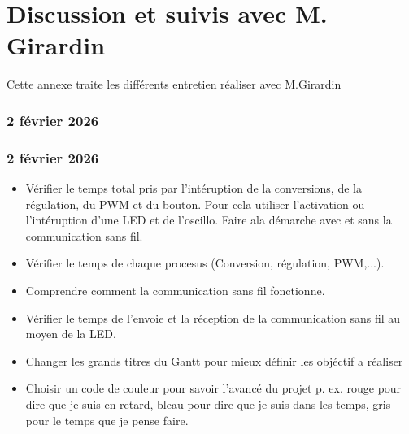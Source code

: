 \chapter{Discussion et suivis avec M. Girardin}
Cette annexe traite les différents entretien réaliser avec M.Girardin


\subsection{2 février 2026}



\subsection{2 février 2026}

\begin{itemize}
    \item Vérifier le temps total pris par l'intéruption de la conversions, de la régulation, du PWM et du bouton. Pour cela utiliser l'activation ou l'intéruption d'une LED et de l'oscillo. Faire ala démarche avec et sans la communication sans fil.

    \item Vérifier le temps de chaque procesus (Conversion, régulation, PWM,...).

    \item Comprendre comment la communication sans fil fonctionne.

    \item Vérifier le temps de l'envoie et la réception de la communication sans fil au moyen de la LED.

    \item Changer les grands titres du Gantt pour mieux définir les objéctif a réaliser
    \item Choisir un code de couleur pour savoir l'avancé du projet p. ex. rouge pour dire que je suis en retard, bleau pour dire que je suis dans les temps, gris pour le temps que je pense faire.
\end{itemize}

